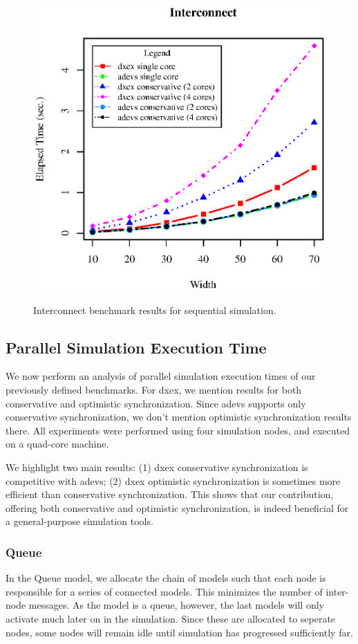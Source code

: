 \begin{figure}
	\includegraphics[width=\columnwidth]{fig/fig3.eps}
	\label{fig3.eps}
	\caption{Interconnect benchmark results for sequential simulation.}
	\label{fig:Interconnect_benchmark}
\end{figure}

\subsection{Parallel Simulation Execution Time}
We now perform an analysis of parallel simulation execution times of our previously defined benchmarks.
For dxex, we mention results for both conservative and optimistic synchronization.
Since adevs supports only conservative synchronization, we don't mention optimistic synchronization results there.
All experiments were performed using four simulation nodes, and executed on a quad-core machine.

We highlight two main results:
(1) dxex conservative synchronization is competitive with adevs;
(2) dxex optimistic synchronization is sometimes more efficient than conservative synchronization.
This shows that our contribution, offering both conservative and optimistic synchronization, is indeed beneficial for a general-purpose simulation tools.

\subsubsection{Queue}
In the Queue model, we allocate the chain of models such that each node is responsible for a series of connected models.
This minimizes the number of inter-node messages.
As the model is a queue, however, the last models will only activate much later on in the simulation.
Since these are allocated to seperate nodes, some nodes will remain idle until simulation has progressed sufficiently far.

